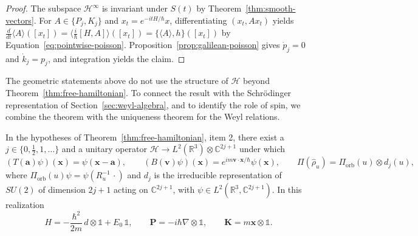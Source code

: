 \begin{proof}
	The subspace $\mathcal{H}^\infty$ is invariant under $S(t)$ by Theorem~\ref{thm:smooth-vectors}. For $A\in\{P_j,K_j\}$ and $x_t=e^{-itH/\hbar}x$, differentiating $(x_t,Ax_t)$ yields $\tfrac{d}{dt}\langle A\rangle([x_t])=\langle\tfrac{i}{\hbar}[H,A]\rangle([x_t])=\{\langle A\rangle,h\}([x_t])$ by Equation~\eqref{eq:pointwise-poisson}. Proposition~\ref{prop:galilean-poisson} gives $\dot p_j=0$ and $\dot k_j=p_j$, and integration yields the claim.
\end{proof}

The geometric statements above do not use the structure of $\mathcal{H}$ beyond Theorem~\ref{thm:free-hamiltonian}. To connect the result with the Schrödinger representation of Section~\ref{sec:weyl-algebra}, and to identify the role of spin, we combine the theorem with the uniqueness theorem for the Weyl relations.

\begin{corollary}\label{cor:schrodinger-realization}
	In the hypotheses of Theorem~\ref{thm:free-hamiltonian}, item 2, there exist a $j\in\{0,\tfrac{1}{2},1,\dots\}$ and a unitary operator $\mathcal{H}\to L^2(\mathbb{R}^3)\otimes\mathbb{C}^{2j+1}$ under which
	\begin{equation}
		(T(\mathbf{a})\psi)(\mathbf{x})=\psi(\mathbf{x}-\mathbf{a}),\qquad (B(\mathbf{v})\psi)(\mathbf{x})=e^{im\mathbf{v}\cdot\mathbf{x}/\hbar}\psi(\mathbf{x}),\qquad \Pi(\hat\rho_u)=\Pi_{\mathrm{orb}}(u)\otimes d_j(u),
	\end{equation}
	where $\Pi_{\mathrm{orb}}(u)\psi=\psi(R_u^{-1}\,\cdot)$ and $d_j$ is the irreducible representation of $SU(2)$ of dimension $2j+1$ acting on $\mathbb{C}^{2j+1}$, with $\psi\in L^2(\mathbb{R}^3,\mathbb{C}^{2j+1})$. In this realization
	\begin{equation}
		H=-\frac{\hbar^2}{2m}\,d\otimes\mathbb{1}+E_0\,\mathbb{1}, \qquad \mathbf{P}=-i\hbar\nabla\otimes\mathbb{1}, \qquad \mathbf{K}=m\mathbf{x}\otimes\mathbb{1}.
	\end{equation}
\end{corollary}

